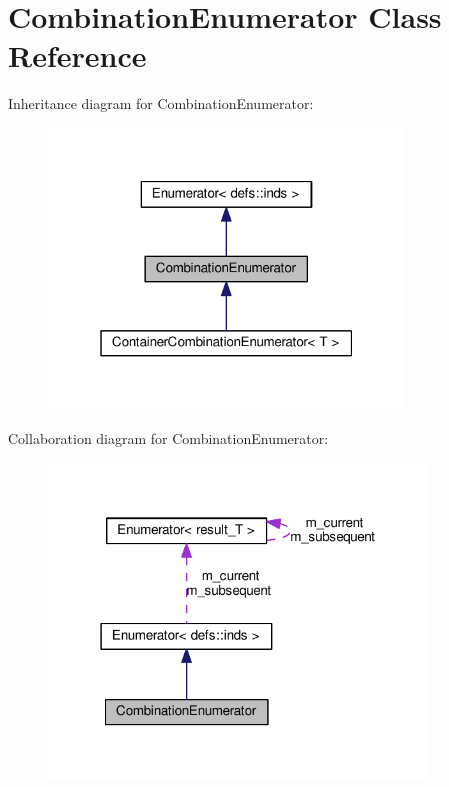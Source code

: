 \hypertarget{classCombinationEnumerator}{}\section{Combination\+Enumerator Class Reference}
\label{classCombinationEnumerator}


Inheritance diagram for Combination\+Enumerator\+:
\nopagebreak
\begin{figure}[H]
\begin{center}
\leavevmode
\includegraphics[width=268pt]{classCombinationEnumerator__inherit__graph}
\end{center}
\end{figure}


Collaboration diagram for Combination\+Enumerator\+:
\nopagebreak
\begin{figure}[H]
\begin{center}
\leavevmode
\includegraphics[width=286pt]{classCombinationEnumerator__coll__graph}
\end{center}
\end{figure}
